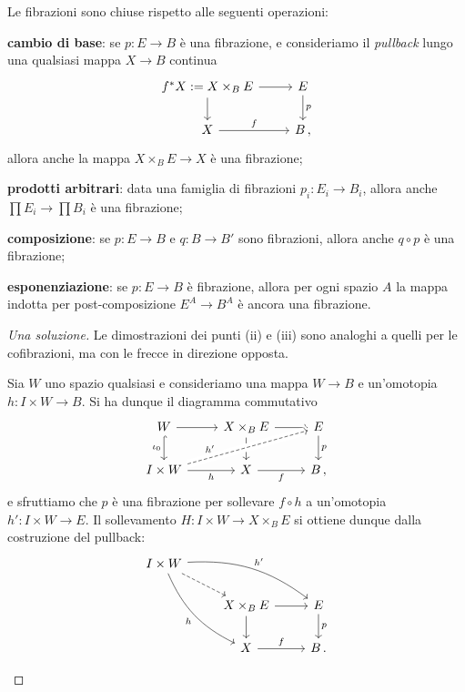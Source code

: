 \begin{exercise}
	Le fibrazioni sono chiuse rispetto alle seguenti operazioni:
	\begin{rmnumerate}	
	\item \textbf{cambio di base}:
	se $p:E \to B$ è una fibrazione,
	e consideriamo il \emph{pullback}
	lungo una qualsiasi mappa $X \to B$ continua 
	\begin{equation*}
		\begin{tikzcd}
			f^*X := X \times_{B} E \ar[d] \ar[r] & E \ar[d, "p"] \\
			X \ar[r, "f"] & B\,,
		\end{tikzcd}
	\end{equation*}
	allora anche la mappa $X \times_{B} E \to X$ è una fibrazione;
	
	\item \textbf{prodotti arbitrari}: data una famiglia di fibrazioni $p_{i}:E_{i} \to B_{i}$,
	allora anche $\prod E_{i} \to \prod B_{i}$ è una fibrazione;
	
	\item \textbf{composizione}: se $p: E \to  B$ e $q:B \to B'$ sono fibrazioni,
	allora anche $q \circ p$ è una fibrazione; 
	
	\item \textbf{esponenziazione}:
	se $p:E \to B$ è fibrazione,
	allora per ogni spazio $A$ la mappa indotta per post-composizione
	$E^{A} \to B^{A}$ è ancora una fibrazione.
	\end{rmnumerate}
	\begin{proof}[Una soluzione]
		Le dimostrazioni dei punti (ii) e (iii) sono analoghi a quelli per le cofibrazioni,
		ma con le frecce in direzione opposta.
		\begin{rmnumerate}
			\item Sia $W$ uno spazio qualsiasi e consideriamo una mappa $W \to B$
			e un'omotopia $h:I \times W \to B$. 
			Si ha dunque il diagramma commutativo
			\begin{equation*}
				\begin{tikzcd}
					W \ar[r] \ar[d, "\iota_{0}"', hook] & X \times_{B} E \ar[d] \ar[r] & E \ar[d, "p"] \\
					I \times W \ar[r, "h"'] \ar[rru, dashed, "h'", crossing over, near start] 
					& X \ar[r, "f"'] & B\,,
				\end{tikzcd}
			\end{equation*}
			e sfruttiamo che $p$ è una fibrazione per sollevare $f \circ h$
			a un'omotopia $h':I \times W \to E$. Il sollevamento $H:I \times W \to X \times_{B} E$ 
			si ottiene dunque dalla costruzione del pullback:
			\begin{equation*}
			\begin{tikzcd}
				I \times W \ar[dr, dashed] \ar[rrd, "h'", bend left=20pt] 
				\ar[ddr, "h"', bend right=20pt] & & \\
				& X \times_{B} E \ar[d] \ar[r] & E \ar[d, "p"] \\
				& X \ar[r, "f"] & B\,.
			\end{tikzcd}
			\end{equation*}
			

\end{rmnumerate}
\end{proof}
\end{exercise}

